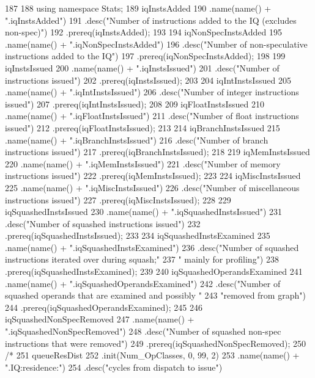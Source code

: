 \begin{DoxyCode}
187 {
188     using namespace Stats;
189     iqInstsAdded
190         .name(name() + ".iqInstsAdded")
191         .desc("Number of instructions added to the IQ (excludes non-spec)")
192         .prereq(iqInstsAdded);
193 
194     iqNonSpecInstsAdded
195         .name(name() + ".iqNonSpecInstsAdded")
196         .desc("Number of non-speculative instructions added to the IQ")
197         .prereq(iqNonSpecInstsAdded);
198 
199     iqInstsIssued
200         .name(name() + ".iqInstsIssued")
201         .desc("Number of instructions issued")
202         .prereq(iqInstsIssued);
203 
204     iqIntInstsIssued
205         .name(name() + ".iqIntInstsIssued")
206         .desc("Number of integer instructions issued")
207         .prereq(iqIntInstsIssued);
208 
209     iqFloatInstsIssued
210         .name(name() + ".iqFloatInstsIssued")
211         .desc("Number of float instructions issued")
212         .prereq(iqFloatInstsIssued);
213 
214     iqBranchInstsIssued
215         .name(name() + ".iqBranchInstsIssued")
216         .desc("Number of branch instructions issued")
217         .prereq(iqBranchInstsIssued);
218 
219     iqMemInstsIssued
220         .name(name() + ".iqMemInstsIssued")
221         .desc("Number of memory instructions issued")
222         .prereq(iqMemInstsIssued);
223 
224     iqMiscInstsIssued
225         .name(name() + ".iqMiscInstsIssued")
226         .desc("Number of miscellaneous instructions issued")
227         .prereq(iqMiscInstsIssued);
228 
229     iqSquashedInstsIssued
230         .name(name() + ".iqSquashedInstsIssued")
231         .desc("Number of squashed instructions issued")
232         .prereq(iqSquashedInstsIssued);
233 
234     iqSquashedInstsExamined
235         .name(name() + ".iqSquashedInstsExamined")
236         .desc("Number of squashed instructions iterated over during squash;"
237               " mainly for profiling")
238         .prereq(iqSquashedInstsExamined);
239 
240     iqSquashedOperandsExamined
241         .name(name() + ".iqSquashedOperandsExamined")
242         .desc("Number of squashed operands that are examined and possibly "
243               "removed from graph")
244         .prereq(iqSquashedOperandsExamined);
245 
246     iqSquashedNonSpecRemoved
247         .name(name() + ".iqSquashedNonSpecRemoved")
248         .desc("Number of squashed non-spec instructions that were removed")
249         .prereq(iqSquashedNonSpecRemoved);
250 /*
251     queueResDist
252         .init(Num_OpClasses, 0, 99, 2)
253         .name(name() + ".IQ:residence:")
254         .desc("cycles from dispatch to issue")
}
\end{DoxyCode}
